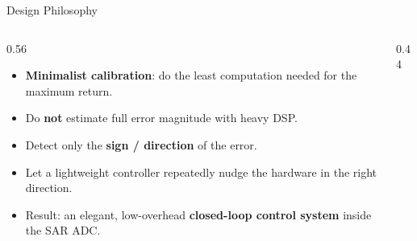\documentclass[aspectratio=169]{beamer}
\begin{document}
\begin{frame}{Design Philosophy}
  \begin{columns}[T]
    \begin{column}{0.56\textwidth}
      \small
      \begin{itemize}
        \item \textbf{Minimalist calibration}: do the least computation needed for the maximum return.
        \item Do \textbf{not} estimate full error magnitude with heavy DSP.
        \item Detect only the \textbf{sign / direction} of the error.
        \item Let a lightweight controller repeatedly nudge the hardware in the right direction.
        \item Result: an elegant, low-overhead \textbf{closed-loop control system} inside the SAR ADC.
      \end{itemize}
    \end{column}
    \begin{column}{0.44\textwidth}
      \centering
    \end{column}
  \end{columns}
\end{frame}
\end{document}
